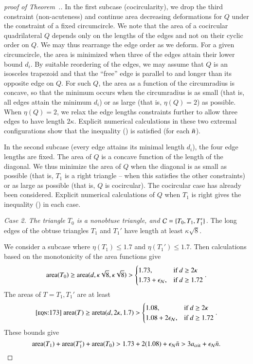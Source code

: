 \begin{proof}[proof of Theorem~.]
In the first subcase (cocircularity), we drop the third constraint
(non-acuteness) and continue area decreasing deformations for $Q$
under the constraint of a fixed circumcircle.  We note that the area
of a cocircular quadrilateral $Q$ depends only on the lengths of the
edges and not on their cyclic order on $Q$.  We may thus rearrange the
edge order as we deform.  For a given circumcircle, the area is
minimized when three of the edges attain their lower bound $d_i$.  By
suitable reordering of the edges, we may assume that $Q$ is an
isosceles trapezoid and that the ``free'' edge is parallel to and
longer than its opposite edge on $Q$.  For such $Q$, the area as a
function of the circumradius is concave, so that the minimum occurs
when the circumradius is as small (that is, all edges attain the
minimum $d_i$) or as large (that is, $\eta(Q)=2$) as possible.  When
$\eta(Q)=2$, we relax the edge lengths constraints further to allow
three edges to have length $2\kappa$.  Explicit numerical calculations
in these two extremal configurations show that the inequality
() is satisfied (for each $\bar n$).

In the second subcase (every edge attains its minimal length $d_i$), the
four edge lengths are fixed.  The area of $Q$ is a concave function of
the length of the diagonal.  We thus minimize the area of $Q$ when the
diagonal is as small as possible (that is, $T_1$ is a right triangle
-- when this satisfies the other constraints) or as large as possible
(that is, $Q$ is cocircular).  The cocircular case has already been
considered.  Explicit numerical calculations of $Q$ when $T_1$ is
right gives the inequality () in each case.


{\it Case 2. The triangle $T_0$ is a nonobtuse triangle, and
  $\mathcal C=\{T_0,T_1,T_1'\}$.}  
The long edges of the obtuse triangles
$T_1$ and $T_1'$ have length at least $\kappa\sqrt{8}$.

We consider a subcase where $\eta(T_1)\le 1.7$ and $\eta(T_1') \le
1.7$.  Then calculations based on the monotonicity of the area
functions give
\[
{\operatorname{area}}(T_0) \ge {\operatorname{area}}(d,\kappa\sqrt{8},\kappa\sqrt{8}) > 
   \begin{cases}1.73,&\text{if } d \ge 2\kappa\\ 
     1.73+\epsilon_{\mathcal N}, & \text{if } d \ge 1.72 \end{cases}.
\]
The areas of $T=T_1,T_1'$ are at least
\begin{equation}\libel{eqn:173}
\area(T) \ge \areta(d,2\kappa,1.7) >
   \begin{cases}1.08,&\text{if } d \ge 2\kappa\\
     1.08+2\epsN, & \text{if } d \ge 1.72 \end{cases}.
\end{equation}
These bounds give
\[
{\operatorname{area}}(T_1) + {\operatorname{area}}(T_1') + {\operatorname{area}}(T_0) > 1.73 + 2(1.08) + \epsilon_{\mathcal N} \bar n > 
3 a_\text{crit} +  \epsilon_{\mathcal N} \bar n.
\]


\end{proof}
